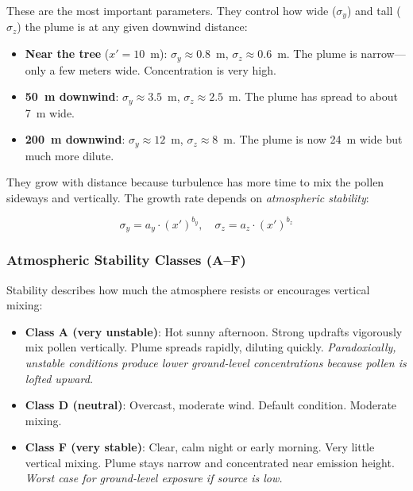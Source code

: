 \documentclass[11pt]{article}
\begin{document}
These are the most important parameters. They control how wide ($\sigma_y$) and tall ($\sigma_z$) the plume is at any given downwind distance:

\begin{itemize}
    \item \textbf{Near the tree} ($x' = 10$~m): $\sigma_y \approx 0.8$~m, $\sigma_z \approx 0.6$~m. The plume is narrow---only a few meters wide. Concentration is very high.
    \item \textbf{50~m downwind}: $\sigma_y \approx 3.5$~m, $\sigma_z \approx 2.5$~m. The plume has spread to about 7~m wide.
    \item \textbf{200~m downwind}: $\sigma_y \approx 12$~m, $\sigma_z \approx 8$~m. The plume is now 24~m wide but much more dilute.
\end{itemize}

They grow with distance because turbulence has more time to mix the pollen sideways and vertically. The growth rate depends on \emph{atmospheric stability}:

\begin{equation}
\sigma_y = a_y \cdot (x')^{b_y}, \quad \sigma_z = a_z \cdot (x')^{b_z}
\end{equation}

\subsubsection{Atmospheric Stability Classes (A--F)}

Stability describes how much the atmosphere resists or encourages vertical mixing:

\begin{itemize}
    \item \textbf{Class A (very unstable)}: Hot sunny afternoon. Strong updrafts vigorously mix pollen vertically. Plume spreads rapidly, diluting quickly. \emph{Paradoxically, unstable conditions produce lower ground-level concentrations because pollen is lofted upward.}
    
    \item \textbf{Class D (neutral)}: Overcast, moderate wind. Default condition. Moderate mixing.
    
    \item \textbf{Class F (very stable)}: Clear, calm night or early morning. Very little vertical mixing. Plume stays narrow and concentrated near emission height. \emph{Worst case for ground-level exposure if source is low.}
\end{itemize}
\end{document}
